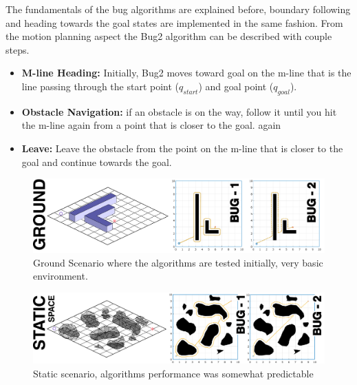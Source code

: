 \documentclass{IEEEtaes}
\begin{document}
The fundamentals of the bug algorithms are explained before, boundary following and heading towards the goal states are implemented in the same fashion. From the motion planning aspect the Bug2 algorithm can be described with couple steps.

\begin{itemize}
\item
  \textbf{M-line Heading:} Initially, Bug2 moves toward goal on the m-line that is the line passing through the start point ($q_{start}$) and goal point ($q_{goal}$).
\item
  \textbf{Obstacle Navigation:} if an obstacle is on the way, follow it until you hit the m-line again from a point that is closer to the goal. 
again
\item
  \textbf{Leave:} Leave the obstacle from the point on the m-line that is closer to the goal and continue towards the goal.
\end{itemize}

\begin{figure}[t!]
    \begin{center}
        \includegraphics[width=0.99\linewidth]{figures/GROUND.pdf}
     \end{center}
     \caption{Ground Scenario where the algorithms are tested initially, very basic environment.}
     \label{ground}
\end{figure}

\begin{figure}[b!]
    \begin{center}
        \includegraphics[width=1.0\linewidth]{figures/STATIC-1.pdf}
     \end{center}
     \caption{Static scenario, algorithms performance was somewhat predictable}
     \label{static}
\end{figure}
\end{document}
